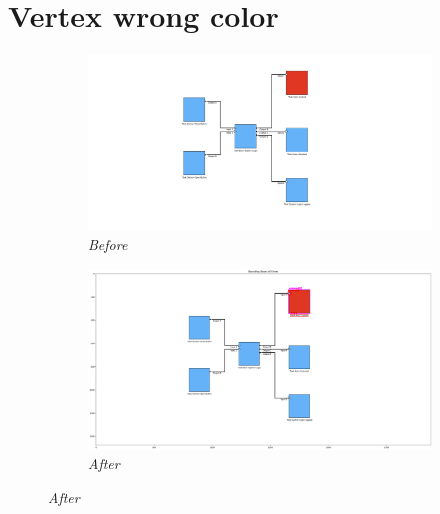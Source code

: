 \documentclass{article}
\begin{document}
\section{Vertex wrong color}
\begin{figure}[H]
    \centering
    \begin{subfigure}[t]{0.9\textwidth}
        \centering
        \includegraphics[width=\textwidth]{testcases/vertex_wrong_color/134341-480129_input_image_after_preprocessing.png}
        \caption*{\textit{Before}}
    \end{subfigure}
    \newline    
    \begin{subfigure}[t]{0.9\textwidth}
        \centering
        \includegraphics[width=\textwidth]{testcases/vertex_wrong_color/134401-825366_element_bbox_errors_labeled_colored.png}
        \caption*{\textit{After}}
    \end{subfigure}
    \label{fig:vertex_wrong_color}
\end{figure}
\newpage
\end{document}

